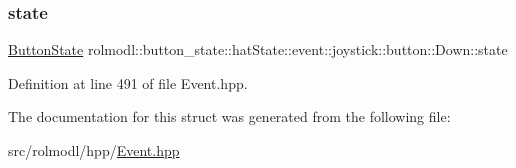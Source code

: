 \subsubsection{\texorpdfstring{state}{state}}
{\footnotesize\ttfamily \mbox{\hyperlink{namespacerolmodl_ad08ec5c56aa1db118f871357b2d475fd}{Button\+State}} rolmodl\+::button\+\_\+state\+::hat\+State\+::event\+::joystick\+::button\+::\+Down\+::state}



Definition at line 491 of file Event.\+hpp.



The documentation for this struct was generated from the following file\+:\begin{DoxyCompactItemize}
\item 
src/rolmodl/hpp/\mbox{\hyperlink{_event_8hpp}{Event.\+hpp}}\end{DoxyCompactItemize}
